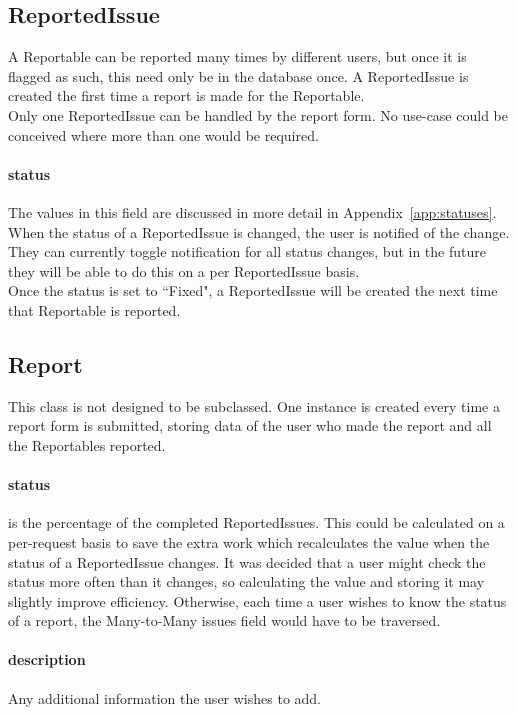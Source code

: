 \subsection{ReportedIssue}
A Reportable can be reported many times by different users, but once it is flagged as such, this need only be in the database once. A ReportedIssue is created the first time a report is made for the Reportable. \\

Only one ReportedIssue can be handled by the report form. No use-case could be conceived where more than one would be required.

\paragraph{status} The values in this field are discussed in more detail in Appendix~\ref{app:statuses}. When the status of a ReportedIssue is changed, the user is notified of the change. They can currently toggle notification for all status changes, but in the future they will be able to do this on a per ReportedIssue basis. \\

Once the status is set to ``Fixed", a ReportedIssue will be created the next time that Reportable is reported.

\subsection{Report}
This class is not designed to be subclassed. One instance is created every time a report form is submitted, storing data of the user who made the report and all the Reportables reported.

\paragraph{status} is the percentage of the completed ReportedIssues. This could be calculated on a per-request basis to save the extra work which recalculates the value when the status of a ReportedIssue changes. It was decided that a user might check the status more often than it changes, so calculating the value and storing it may slightly improve efficiency. Otherwise, each time a user wishes to know the status of a report, the Many-to-Many issues field would have to be traversed.

\paragraph{description} Any additional information the user wishes to add.

